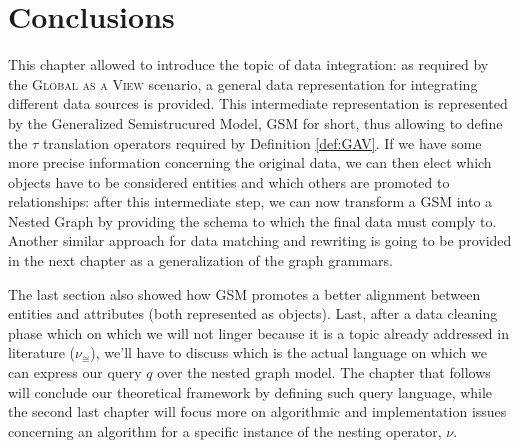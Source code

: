 \section{Conclusions}

This chapter allowed to introduce the topic of data integration: as required by the \textsc{Global as a View} scenario, a general data representation for integrating different data sources is provided. This intermediate representation is represented by the Generalized Semistrucured Model, GSM for short, thus allowing to define the $\tau$ translation operators required by Definition \vref{def:GAV}. If we have some more precise information concerning the original data, we can then elect which  objects have to be considered entities and which others are promoted to relationships: after this intermediate step, we can now transform a GSM into a Nested Graph by providing the schema to which the final data must comply to. Another similar approach for data matching and rewriting is going to be provided in the next chapter as a generalization of the graph grammars.


The last section also showed how GSM promotes a better alignment between entities and attributes (both represented as objects). %
Last, after a data cleaning phase which on which we will not linger because it is a topic already addressed in literature ($\nu_\cong$), we'll have to discuss which is the actual language on which we can express our query $q$ over the nested graph model. %
The chapter that follows will conclude our theoretical framework by defining such query language, while the second last chapter will focus more on algorithmic and implementation issues concerning an algorithm for a specific instance of the nesting operator, $\nu$.